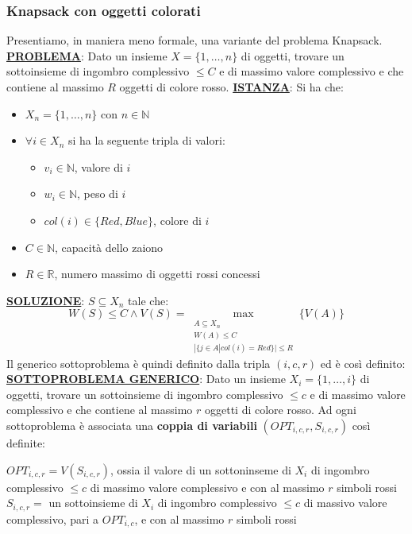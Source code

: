 \documentclass[12pt]{article}
\begin{document}
\subsubsection{Knapsack con oggetti colorati}
Presentiamo, in maniera meno formale, una variante del problema Knapsack. \newline
\textbf{\underline{PROBLEMA}}: Dato un insieme $X = \{1,\dots, n\}$ di oggetti, trovare un sottoinsieme di ingombro complessivo $\leq C$ e di massimo valore complessivo e che contiene al massimo $R$ oggetti di colore rosso. \newline
\textbf{\underline{ISTANZA}}: Si ha che:
\begin{itemize}
    \item $X_n = \{1, \dots, n\}$ con $n \in \mathbb{N}$
    \item $\forall i \in X_n$ si ha la seguente tripla di valori:
    \begin{itemize}
        \item $v_i \in \mathbb{N}$, valore di $i$
        \item $w_i \in \mathbb{N}$, peso di $i$
        \item $col(i) \in \{Red, Blue\}$, colore di $i$
    \end{itemize}
    \item $C \in \mathbb{N}$, capacità dello zaiono
    \item $R \in \mathbb{R}$, numero massimo di oggetti rossi concessi
\end{itemize}
\textbf{\underline{SOLUZIONE}}: $S \subseteq X_n$ tale che:
$$W(S) \leq C \land V(S) = \max_{\substack{A \subseteq X_n \\ W(A) \leq C \\ |\{j \in A| col(i) = Red\}| \leq R}}\{V(A)\}$$
Il generico sottoproblema è quindi definito dalla tripla $(i, c, r)$ ed è così definito: \newline
\textbf{\underline{SOTTOPROBLEMA GENERICO}}: Dato un insieme $X_i = \{1,\dots, i\}$ di oggetti, trovare un sottoinsieme di ingombro complessivo $\leq c$ e di massimo valore complessivo e che contiene al massimo $r$ oggetti di colore rosso. \newline
Ad ogni sottoproblema è associata una \textbf{coppia di variabili} $(OPT_{i,c,r}, S_{i,c,r})$ così definite:
\begin{center}
    $OPT_{i,c, r} = V(S_{i,c, r})$, ossia il valore di un sottoninseme di $X_i$ di ingombro complessivo $\leq c$ di massimo valore complessivo e con al massimo $r$ simboli rossi \\
    $S_{i,c, r} =$ un sottoinsieme di $X_i$ di ingombro complessivo $\leq c$ di massivo valore complessivo, pari a $OPT_{i,c}$, e con al massimo $r$ simboli rossi
\end{center}
\end{document}
